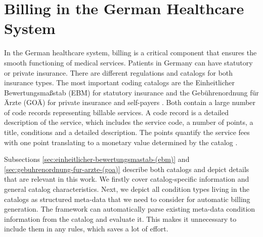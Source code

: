 \chapter{Billing in the German Healthcare System}\label{ch:billing-in-the-german-healthcare-system}

In the German healthcare system, billing is a critical component that ensures the smooth functioning of medical services.
Patients in Germany can have statutory or private insurance.
There are different regulations and catalogs for both insurance types.
The most important coding catalogs are the Einheitlicher Bewertungsmaßstab (EBM) for statutory insurance and the Gebührenordnung für Ärzte (GOÄ) for private insurance and self-payers \cite{Stausberg1998}.
Both contain a large number of code records representing billable services.
A code record is a detailed description of the service, which includes the service code, a number of points, a title, conditions and a detailed description.
The points quantify the service fees with one point translating to a monetary value determined by the catalog \cite{Stausberg1998}.

Subsections \ref{sec:einheitlicher-bewertungsmastab-(ebm)} and \ref{sec:gebuhrenordnung-fur-arzte-(goa)} describe both catalogs and depict details that are relevant in this work.
We firstly cover catalog-specific information and general catalog characteristics.
Next, we depict all condition types living in the catalogs as structured meta-data that we need to consider for automatic billing generation.
The framework can automatically parse existing meta-data condition information from the catalog and evaluate it.
This makes it unnecessary to include them in any rules, which saves a lot of effort.



